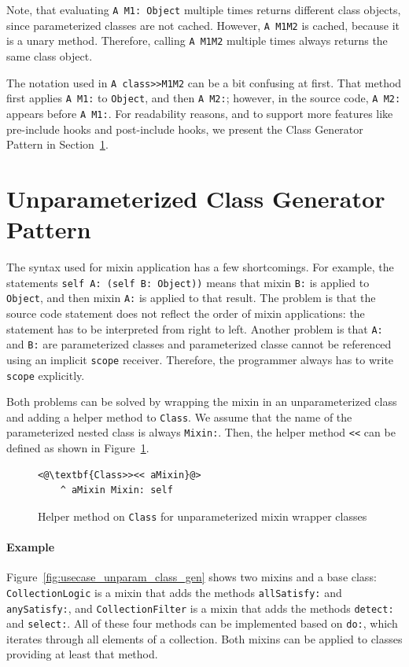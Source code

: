 Note, that evaluating \texttt{A M1: Object} multiple times returns different class objects, since parameterized classes are not cached. However, \texttt{A M1M2} is cached, because it is a unary method. Therefore, calling \texttt{A M1M2} multiple times always returns the same class object.

The notation used in \texttt{A class>>M1M2} can be a bit confusing at first. That method first applies \texttt{A M1:} to \texttt{Object}, and then \texttt{A M2:}; however, in the source code, \texttt{A M2:} appears before \texttt{A M1:}. For readability reasons, and to support more features like pre-include hooks and post-include hooks, we present the Class Generator Pattern in Section~\ref{sec:usecase_classgen}.

\section{Unparameterized Class Generator Pattern}
\label{sec:usecase_classgen}
The syntax used for mixin application has a few shortcomings. For example, the statements \texttt{self A: (self B: Object))} means that mixin \texttt{B:} is applied to \texttt{Object}, and then mixin \texttt{A:} is applied to that result. The problem is that the source code statement does not reflect the order of mixin applications: the statement has to be interpreted from right to left. Another problem is that \texttt{A:} and \texttt{B:} are parameterized classes and parameterized classe cannot be referenced using an implicit \texttt{scope} receiver. Therefore, the programmer always has to write \texttt{scope} explicitly.

Both problems can be solved by wrapping the mixin in an unparameterized class and adding a helper method to \texttt{Class}. We assume that the name of the parameterized nested class is always \texttt{Mixin:}. Then, the helper method \texttt{<<} can be defined as shown in Figure~\ref{fig:usecase_class_lele}.

\begin{figure}[!htp]
\begin{lstlisting}
<@\textbf{Class>><< aMixin}@>
    ^ aMixin Mixin: self
\end{lstlisting}
\caption{Helper method on \texttt{Class} for unparameterized mixin wrapper classes}
\label{fig:usecase_class_lele}
\end{figure}

\paragraph{Example}
Figure~\ref{fig:usecase_unparam_class_gen} shows two mixins and a base class: \texttt{CollectionLogic} is a mixin that adds the methods \texttt{allSatisfy:} and \texttt{anySatisfy:}, and \texttt{CollectionFilter} is a mixin that adds the methods \texttt{detect:} and \texttt{select:}. All of these four methods can be implemented based on \texttt{do:}, which iterates through all elements of a collection. Both mixins can be applied to classes providing at least that method. %

